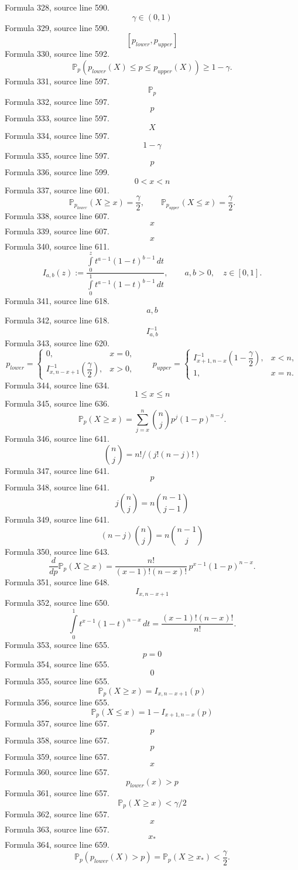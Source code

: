 \documentclass{ctexart}
\begin{document}
Formula 328, source line 590.
\[\gamma\in(0,1)\]
Formula 329, source line 590.
\[[p_{lower},p_{upper}]\]
Formula 330, source line 592.
\[
\mathbb P_p\left(p_{lower}(X)\leq p\leq p_{upper}(X)\right)
\geq1-\gamma.
\]
Formula 331, source line 597.
\[\mathbb P_p\]
Formula 332, source line 597.
\[p\]
Formula 333, source line 597.
\[X\]
Formula 334, source line 597.
\[1-\gamma\]
Formula 335, source line 597.
\[p\]
Formula 336, source line 599.
\[0<x<n\]
Formula 337, source line 601.
\[
\mathbb P_{p_{lower}}(X\geq x)=\frac\gamma2,
\qquad
\mathbb P_{p_{upper}}(X\leq x)=\frac\gamma2.
\]
Formula 338, source line 607.
\[x\]
Formula 339, source line 607.
\[x\]
Formula 340, source line 611.
\[
I_{a,b}(z)
:=\frac{\int\limits_0^z t^{a-1}(1-t)^{b-1}\,dt}
{\int\limits_0^1 t^{a-1}(1-t)^{b-1}\,dt},
\qquad a,b>0,\quad z\in[0,1].
\]
Formula 341, source line 618.
\[a,b\]
Formula 342, source line 618.
\[I_{a,b}^{-1}\]
Formula 343, source line 620.
\[
p_{lower}=
\begin{cases}
0,&x=0,\\
I_{x,n-x+1}^{-1}\left(\dfrac\gamma2\right),&x>0,
\end{cases}
\qquad
p_{upper}=
\begin{cases}
I_{x+1,n-x}^{-1}\left(1-\dfrac\gamma2\right),&x<n,\\
1,&x=n.
\end{cases}
\]
Formula 344, source line 634.
\[1\leq x\leq n\]
Formula 345, source line 636.
\[
\mathbb P_p(X\geq x)
=\sum\limits_{j=x}^{n}\binom njp^j(1-p)^{n-j}.
\]
Formula 346, source line 641.
\[\binom nj=n!/(j!(n-j)!)\]
Formula 347, source line 641.
\[p\]
Formula 348, source line 641.
\[j\binom nj=n\binom{n-1}{j-1}\]
Formula 349, source line 641.
\[(n-j)\binom nj=n\binom{n-1}{j}\]
Formula 350, source line 643.
\[
\frac{d}{dp}\mathbb P_p(X\geq x)
=\frac{n!}{(x-1)!(n-x)!}\,p^{x-1}(1-p)^{n-x}.
\]
Formula 351, source line 648.
\[I_{x,n-x+1}\]
Formula 352, source line 650.
\[
\int\limits_0^1t^{x-1}(1-t)^{n-x}\,dt
=\frac{(x-1)!(n-x)!}{n!}.
\]
Formula 353, source line 655.
\[p=0\]
Formula 354, source line 655.
\[0\]
Formula 355, source line 655.
\[\mathbb P_p(X\geq x)=I_{x,n-x+1}(p)\]
Formula 356, source line 655.
\[\mathbb P_p(X\leq x)=1-I_{x+1,n-x}(p)\]
Formula 357, source line 657.
\[p\]
Formula 358, source line 657.
\[p\]
Formula 359, source line 657.
\[x\]
Formula 360, source line 657.
\[p_{lower}(x)>p\]
Formula 361, source line 657.
\[\mathbb P_p(X\geq x)<\gamma/2\]
Formula 362, source line 657.
\[x\]
Formula 363, source line 657.
\[x_*\]
Formula 364, source line 659.
\[
\mathbb P_p\left(p_{lower}(X)>p\right)
=\mathbb P_p(X\geq x_*)<\frac\gamma2.
\]
\end{document}

